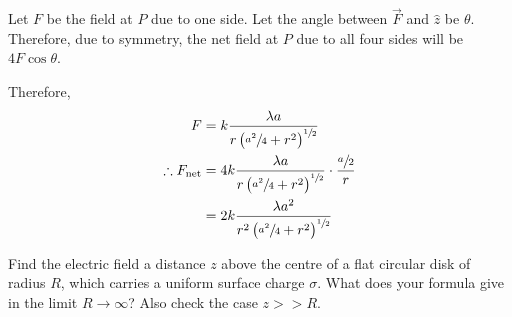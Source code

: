 \documentclass[fleqn, a4paper, 12pt, oneside]{amsart}
\theoremstyle{definition}
\theoremstyle{theorem}
\begin{document}
\begin{solution}
	Let $F$ be the field at $P$ due to one side.
	Let the angle between $\overrightarrow{F}$ and $\hat{z}$ be $\theta$.
	Therefore, due to symmetry, the net field at $P$ due to all four sides will be $4 F \cos \theta$.
	\begin{figure}[H]
	\end{figure}
	Therefore,
	\begin{align*}
		F &= k \dfrac{\lambda a}{r \left( \sfrac{a^2}{4} + r^2 \right)^{\sfrac{1}{2}}}\\
		\therefore F_{\textnormal{net}} &= 4 k \dfrac{\lambda a}{r \left( \sfrac{a^2}{4} + r^2 \right)^{\sfrac{1}{2}}} \cdot \dfrac{\sfrac{a}{2}}{r}\\
		&= 2 k \dfrac{\lambda a^2}{r^2 \left( \sfrac{a^2}{4} + r^2 \right)^{\sfrac{1}{2}}}
	\end{align*}
\end{solution}

\begin{question}
	Find the electric field a distance $z$ above the centre of a flat circular disk of radius $R$, which carries a uniform surface charge $\sigma$. What does your formula give in the limit $R \to \infty$? Also check the case $z >> R$.
\end{question}
\end{document}
